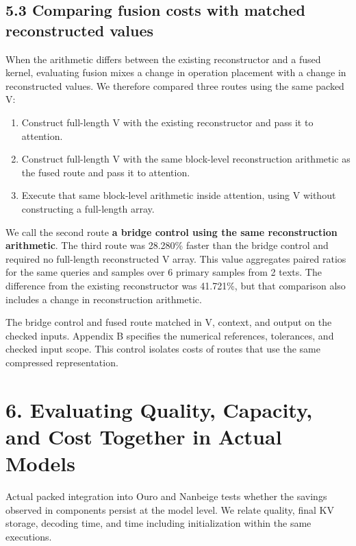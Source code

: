 \documentclass[10pt,a4paper]{article}
\newcommand{\tightlist}{\setlength{\itemsep}{1pt}\setlength{\parskip}{0pt}}
\begin{document}
\subsection{5.3 Comparing fusion costs with matched reconstructed values}\label{comparing-fusion-costs-with-matched-reconstructed-values}

When the arithmetic differs between the existing reconstructor and a fused kernel, evaluating fusion mixes a change in operation placement with a change in reconstructed values. We therefore compared three routes using the same packed V:

\begin{enumerate}
\def\labelenumi{\arabic{enumi}.}
\tightlist
\item
  Construct full-length V with the existing reconstructor and pass it to attention.
\item
  Construct full-length V with the same block-level reconstruction arithmetic as the fused route and pass it to attention.
\item
  Execute that same block-level arithmetic inside attention, using V without constructing a full-length array.
\end{enumerate}

We call the second route \textbf{a bridge control using the same reconstruction arithmetic}. The third route was 28.280\% faster than the bridge control and required no full-length reconstructed V array. This value aggregates paired ratios for the same queries and samples over 6 primary samples from 2 texts. The difference from the existing reconstructor was 41.721\%, but that comparison also includes a change in reconstruction arithmetic.

The bridge control and fused route matched in V, context, and output on the checked inputs. Appendix B specifies the numerical references, tolerances, and checked input scope. This control isolates costs of routes that use the same compressed representation.

\section{6. Evaluating Quality, Capacity, and Cost Together in Actual Models}\label{evaluating-quality-capacity-and-cost-together-in-actual-models}

Actual packed integration into Ouro and Nanbeige tests whether the savings observed in components persist at the model level. We relate quality, final KV storage, decoding time, and time including initialization within the same executions.
\end{document}
